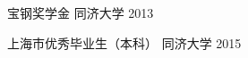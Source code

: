 


\begin{cvhonors}

\cvhonor
{宝钢奖学金} %
{} %
{同济大学} %
{2013} %



\cvhonor
{上海市优秀毕业生（本科）} %
{} %
{同济大学} %
{2015} %


\end{cvhonors}